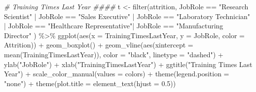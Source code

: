 \documentclass[
]{article}
\newenvironment{Shaded}{\begin{snugshade}}{\end{snugshade}}
\newcommand{\AttributeTok}[1]{\textcolor[rgb]{0.77,0.63,0.00}{#1}}
\newcommand{\CommentTok}[1]{\textcolor[rgb]{0.56,0.35,0.01}{\textit{#1}}}
\newcommand{\FloatTok}[1]{\textcolor[rgb]{0.00,0.00,0.81}{#1}}
\newcommand{\FunctionTok}[1]{\textcolor[rgb]{0.00,0.00,0.00}{#1}}
\newcommand{\NormalTok}[1]{#1}
\newcommand{\OtherTok}[1]{\textcolor[rgb]{0.56,0.35,0.01}{#1}}
\newcommand{\SpecialCharTok}[1]{\textcolor[rgb]{0.00,0.00,0.00}{#1}}
\newcommand{\StringTok}[1]{\textcolor[rgb]{0.31,0.60,0.02}{#1}}
\begin{document}
\begin{Shaded}
\begin{Highlighting}[]
\CommentTok{\# Training Times Last Year \#\#\#\#}
\NormalTok{t }\OtherTok{\textless{}{-}} \FunctionTok{filter}\NormalTok{(attrition, JobRole }\SpecialCharTok{==} \StringTok{"Research Scientist"} \SpecialCharTok{|}\NormalTok{ JobRole }\SpecialCharTok{==} \StringTok{"Sales Executive"}  \SpecialCharTok{|}\NormalTok{ JobRole }\SpecialCharTok{==} \StringTok{"Laboratory Technician"} \SpecialCharTok{|}\NormalTok{ JobRole }\SpecialCharTok{==} \StringTok{"Healthcare Representative"}\SpecialCharTok{|}\NormalTok{ JobRole }\SpecialCharTok{==} \StringTok{"Manufacturing Director"}\NormalTok{ ) }\SpecialCharTok{\%\textgreater{}\%}
  \FunctionTok{ggplot}\NormalTok{(}\FunctionTok{aes}\NormalTok{(}\AttributeTok{x =}\NormalTok{ TrainingTimesLastYear, }\AttributeTok{y =}\NormalTok{ JobRole, }\AttributeTok{color =}\NormalTok{ Attrition)) }\SpecialCharTok{+}
  \FunctionTok{geom\_boxplot}\NormalTok{() }\SpecialCharTok{+}
  \FunctionTok{geom\_vline}\NormalTok{(}\FunctionTok{aes}\NormalTok{(}\AttributeTok{xintercept =} \FunctionTok{mean}\NormalTok{(TrainingTimesLastYear)), }\AttributeTok{color =} \StringTok{"black"}\NormalTok{, }\AttributeTok{linetype =} \StringTok{"dashed"}\NormalTok{) }\SpecialCharTok{+}
  \FunctionTok{ylab}\NormalTok{(}\StringTok{"JobRole"}\NormalTok{) }\SpecialCharTok{+}
  \FunctionTok{xlab}\NormalTok{(}\StringTok{"TrainingTimesLastYear"}\NormalTok{) }\SpecialCharTok{+}
  \FunctionTok{ggtitle}\NormalTok{(}\StringTok{"Training Times Last Year"}\NormalTok{) }\SpecialCharTok{+}
  \FunctionTok{scale\_color\_manual}\NormalTok{(}\AttributeTok{values =}\NormalTok{ colors) }\SpecialCharTok{+}
  \FunctionTok{theme}\NormalTok{(}\AttributeTok{legend.position =} \StringTok{"none"}\NormalTok{) }\SpecialCharTok{+}
  \FunctionTok{theme}\NormalTok{(}\AttributeTok{plot.title =} \FunctionTok{element\_text}\NormalTok{(}\AttributeTok{hjust =} \FloatTok{0.5}\NormalTok{)) }



\end{Highlighting}
\end{Shaded}
\end{document}
